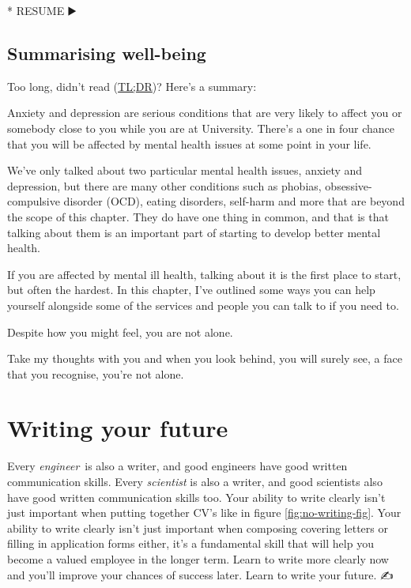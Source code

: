 \documentclass[
]{book}
\newenvironment{Shaded}{\begin{snugshade}}{\end{snugshade}}
\newcommand{\NormalTok}[1]{#1}
\newcommand{\SpecialStringTok}[1]{\textcolor[rgb]{0.31,0.60,0.02}{#1}}
\begin{document}
\begin{Shaded}
\begin{Highlighting}[]
\SpecialStringTok{* }\NormalTok{RESUME ▶️}
\end{Highlighting}
\end{Shaded}

\hypertarget{tldr3}{%
\section{Summarising well-being}\label{tldr3}}

Too long, didn't read (\href{https://en.wiktionary.org/wiki/too_long;_didn\%27t_read}{TL;DR})? Here's a summary:

Anxiety and depression are serious conditions that are very likely to affect you or somebody close to you while you are at University. There's a one in four chance that you will be affected by mental health issues at some point in your life.

We've only talked about two particular mental health issues, anxiety and depression, but there are many other conditions such as phobias, obsessive-compulsive disorder (OCD), eating disorders, self-harm and more that are beyond the scope of this chapter. They do have one thing in common, and that is that talking about them is an important part of starting to develop better mental health.

If you are affected by mental ill health, talking about it is the first place to start, but often the hardest. In this chapter, I've outlined some ways you can help yourself alongside some of the services and people you can talk to if you need to.

Despite how you might feel, you are not alone.

Take my thoughts with you and when you look behind, you will surely see, a face that you recognise, you're not alone. \citep{yourenotalone}

\hypertarget{writing}{%
\chapter{Writing your future}\label{writing}}

Every \emph{engineer}~is also a writer, and good engineers have good written communication skills. Every \emph{scientist} is also a writer, and good scientists also have good written communication skills too. Your ability to write clearly isn't just important when putting together CV's like in figure \ref{fig:no-writing-fig}. Your ability to write clearly isn't just important when composing covering letters or filling in application forms either, it's a fundamental skill that will help you become a valued employee in the longer term. Learn to write more clearly now and you'll improve your chances of success later. Learn to write your future. ✍️
\end{document}
